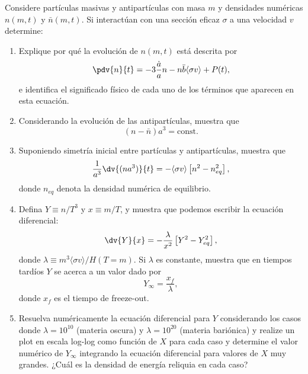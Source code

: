 \documentclass[../main]{subfiles}
\begin{document}
\begin{enumerate}
    Considere partículas masivas y antipartículas con masa $m$ y densidades numéricas $n(m, t)$ y $\bar{n}(m ,t)$. Si interactúan con una sección eficaz $\sigma$ a una velocidad $v$ determine:
    \begin{enumerate}
        \item Explique por qué la evolución de $n(m, t)$ está descrita por 
        \begin{equation}
            \pdv{n}{t}=-3\dfrac{\dot{a}}{a}n-n\bar{b}\langle \sigma v\rangle+P(t),
        \end{equation}
        e identifica el significado físico de cada uno de los términos que aparecen en esta ecuación.
        \item Considerando la evolución de las antipartículas, muestra que 
        \begin{equation}
            (n-\bar{n})a^3 = \text{const}.
        \end{equation}
        \item Suponiendo simetría inicial entre partículas y antipartículas, muestra que 
        \begin{equation}
            \dfrac{1}{a^3}\dv{(na^3)}{t}=-\langle \sigma v\rangle \left[n^2-n^2_{eq}\right],
        \end{equation}
        donde $n_{eq}$ denota la densidad numérica de equilibrio.
        \item Defina $Y \equiv n/T^3$ y $x \equiv m/T$, y muestra que podemos escribir la ecuación diferencial:
        \begin{equation}
            \dv{Y}{x}=-\dfrac{\lambda}{x^2}\left[Y^2-Y^2_{eq}\right],
        \end{equation}
        donde $\lambda \equiv m^3 \langle \sigma v\rangle/ H(T=m)$. Si $\lambda$ es constante, muestra que en tiempos tardíos $Y$ se acerca a un valor dado por 
        \begin{equation}
            Y_{\infty}=\dfrac{x_f}{\lambda},
        \end{equation}
        donde $x_f$ es el tiempo de freeze-out.
        \item Resuelva numéricamente la ecuación diferencial para $Y$ considerando los casos donde $\lambda = 10^{10}$ (materia oscura) y $\lambda=10^{20}$ (materia bariónica) y realize un plot en escala log-log como función de $X$ para cada caso y determine el valor numérico de $Y_{\infty}$ integrando la ecuación diferencial para valores de $X$ muy grandes. ¿Cuál es la densidad de energía reliquia en cada caso?
    \end{enumerate}
\end{enumerate}
\end{document}
